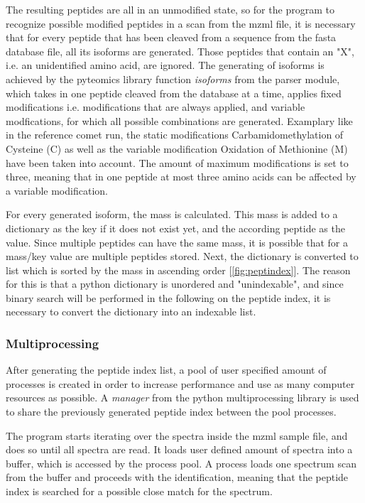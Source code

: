 \documentclass[11pt]{article}
\begin{document}
The resulting peptides are all in an unmodified state, so for the program to recognize possible modified peptides in a scan from the mzml file, it is necessary that for every peptide that has been cleaved from a sequence from the fasta database file, all its isoforms are generated. Those peptides that contain an "X", i.e. an unidentified amino acid, are ignored. The generating of isoforms is achieved by the pyteomics library function \textit{isoforms} from the parser module, which takes in one peptide cleaved from the database at a time, applies fixed modifications i.e. modifications that are always applied, and variable modfications, for which all possible combinations are generated. Examplary like in the reference comet run, the static modifications Carbamidomethylation of Cysteine (C) as well as the variable modification Oxidation of Methionine (M) have been taken into account. The amount of maximum modifications is set to three, meaning that in one peptide at most three amino acids can be affected by a variable modification.

For every generated isoform, the mass is calculated. This mass is added to a dictionary as the key if it does not exist yet, and the according peptide as the value. Since multiple peptides can have the same mass, it is possible that for a mass/key value are multiple peptides stored. Next, the dictionary is converted to list which is sorted by the mass in ascending order [\cref{fig:peptindex}]. The reason for this is that a python dictionary is unordered and "unindexable", and since binary search will be performed in the following on the peptide index, it is necessary to convert the dictionary into an indexable list.
 
\subsubsection{Multiprocessing}
After generating the peptide index list, a pool of user specified amount of processes is created in order to increase performance and use as many computer resources as possible. A \textit{manager} from the python multiprocessing library is used to share the previously generated peptide index between the pool processes. 

The program starts iterating over the spectra inside the mzml sample file, and does so until all spectra are read. It loads user defined amount of spectra into a buffer, which is accessed by the process pool. A process loads one spectrum scan from the buffer and proceeds with the identification, meaning that the peptide index is searched for a possible close match for the spectrum.
\end{document}

